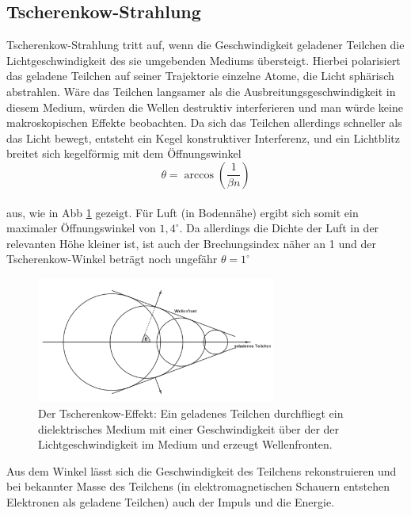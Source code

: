 \subsection{Tscherenkow-Strahlung}
Tscherenkow-Strahlung tritt auf, wenn die Geschwindigkeit geladener Teilchen die Lichtgeschwindigkeit des sie umgebenden Mediums übersteigt. Hierbei polarisiert das geladene Teilchen auf seiner Trajektorie einzelne Atome, die Licht sphärisch abstrahlen. Wäre das Teilchen langsamer als die Ausbreitungsgeschwindigkeit in diesem Medium, würden die Wellen destruktiv interferieren und man würde keine makroskopischen Effekte beobachten. Da sich das Teilchen allerdings schneller als das Licht bewegt, entsteht ein Kegel konstruktiver Interferenz, und ein Lichtblitz breitet sich kegelförmig mit dem Öffnungswinkel
\begin{equation}
\theta = \arccos\left(\frac{1}{\beta n}\right) \label{eq:cherenkow}
\end{equation}\\
aus, wie in Abb \ref{img:cherenkow} gezeigt. Für Luft (in Bodennähe) ergibt sich somit ein maximaler Öffnungswinkel von $1,4^{\circ}$\cite{Grupen}. Da allerdings die Dichte der Luft in der relevanten Höhe kleiner ist, ist auch der Brechungsindex näher an 1 und der Tscherenkow-Winkel beträgt noch ungefähr $\theta = 1^{\circ}$\cite{Grupen}
\begin{figure}[htbp]
\centering
\includegraphics[width=0.7\textwidth]{Images/cherenkow.png}
\caption{Der Tscherenkow-Effekt: Ein geladenes Teilchen durchfliegt ein dielektrisches Medium mit einer Geschwindigkeit über der der Lichtgeschwindigkeit im Medium und erzeugt Wellenfronten.}
\label{img:cherenkow}
\end{figure}
Aus dem Winkel lässt sich die Geschwindigkeit des Teilchens rekonstruieren und bei bekannter Masse des Teilchens (in elektromagnetischen Schauern entstehen Elektronen als geladene Teilchen) auch der Impuls und die Energie.

